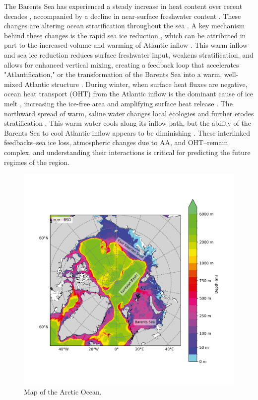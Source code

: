 \documentclass[draft]{agujournal2019}
\begin{document}
The Barents Sea has experienced a steady increase in heat content over recent decades \cite{Smedsrud2013,Bianco2024}, accompanied by a decline in near-surface freshwater content \cite{Watelet2020}. These changes are altering ocean stratification throughout the sea \cite{Lind2018,Hordoir2022}. A key mechanism behind these changes is the rapid sea ice reduction \cite{Rieke2023}, which can be attributed in part to the increased volume and warming of Atlantic inflow \cite{Smedsrud2010,Onarheim2018,Smedsrud2022}. This warm inflow and sea ice reduction reduces surface freshwater input, weakens stratification, and allows for enhanced vertical mixing, creating a feedback loop that accelerates "Atlantification," or the transformation of the Barents Sea into a warm, well-mixed Atlantic structure \cite{Arthun2012,Polyakov2017,Gerland2023}. During winter, when surface heat fluxes are negative, ocean heat transport (OHT) from the Atlantic inflow is the dominant cause of ice melt \cite{Ivanov2012,Tsubouchi2021}, increasing the ice-free area and amplifying surface heat release \cite{Skagseth2020}. The northward spread of warm, saline water \cite{Oziel2016} changes local ecologies \cite{Bogstad2015,Dalpadado2014,Ingvaldsen2021} and further erodes stratification \cite{Lind2018}. This warm water cools along its inflow path, but the ability of the Barents Sea to cool Atlantic inflow appears to be diminishing \cite{Shu2021,Skagseth2020}. These interlinked feedbacks--sea ice loss, atmospheric changes due to AA, and OHT--remain complex, and understanding their interactions is critical for predicting the future regimes of the region.

\begin{figure}
    \includegraphics[width=\linewidth]{figs/ASTE_bathymetry_labels.png}
    \caption{Map of the Arctic Ocean.}
    \label{fig:timeseries}
\end{figure}
\end{document}
